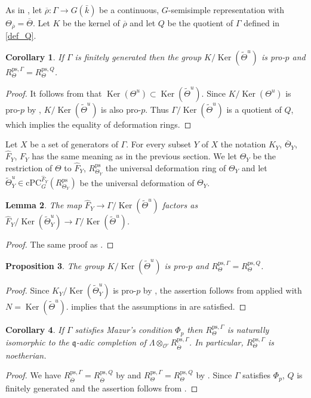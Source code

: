\documentclass{amsart}
\newtheorem{prop}{Proposition}[section]
\newtheorem{lem}[prop]{Lemma}
\newtheorem{cor}[prop]{Corollary}
\theoremstyle{definition}
\theoremstyle{remark}
\DeclareMathOperator{\Ker}{Ker}
\newcommand{\OO}{\mathcal O}
\newcommand{\qq}{\mathfrak{q}}
\newcommand{\rhobar}{\overline{\rho}}
\newcommand{\kbar}{\bar{k}}
\newcommand{\cPC}{\mathrm{cPC}}
\newcommand{\Thetabar}{\overline{\Theta}}
\newcommand{\ps}{\mathrm{ps}}
\newcommand{\Fhat}{\widehat{F}}
\newcommand{\wTheta}{\widetilde{\Theta}}
\begin{document}
As in , let $\rhobar: \Gamma \rightarrow G(\kbar)$ be a 
continuous, $G$-semisimple representation with $\Theta_{\rhobar}=\Thetabar$.
Let $K$ be the kernel of $\rhobar$ and let $Q$ be the quotient of $\Gamma$ 
defined in \eqref{def_Q}.


\begin{cor}\label{pro-p-again} If $\Gamma$ is finitely generated then the group $K/\Ker(\wTheta^u)$ is 
pro-$p$ and $R^{\ps, \Gamma}_{\Theta}=R^{\ps, Q}_{\Theta}$.
\end{cor}
\begin{proof} It follows from  that $\Ker(\Theta^u)\subset \Ker(\wTheta^u)$. Since $K/\Ker(\Theta^u)$ is pro-$p$ by , 
$K/\Ker(\wTheta^u)$ is also pro-$p$. Thus $\Gamma/\Ker(\wTheta^u)$ 
is a quotient of $Q$, which implies the equality of deformation rings.
\end{proof}

Let $X$ be a set of generators of $\Gamma$. For every subset $Y$ of $X$ the notation 
$K_Y$, $\Thetabar_Y$, $\widehat{F}_Y$, $F_Y$ has the same meaning as in the previous 
section. We let $\Theta_Y$ be the restriction of $\Theta$ to $\widehat{F}_Y$, 
$R^{\ps}_{\Theta_Y}$ the universal deformation ring of $\Theta_Y$ and let $\wTheta^u_Y\in \cPC^{\widehat{F}_Y}_G(R^{\ps}_{\Theta_Y})$ be
the universal deformation of $\Theta_Y$.

\begin{lem}\label{thru} The 
map $\Fhat_Y \rightarrow \Gamma/\Ker(\wTheta^u)$ factors as
$\Fhat_Y/\Ker(\wTheta^u_Y)\rightarrow \Gamma /\Ker(\wTheta^u)$. 
\end{lem}
\begin{proof} The same proof as .
\end{proof}

\begin{prop}\label{main_kappa} The group $K/\Ker(\wTheta^u)$ is pro-$p$ and 
$R^{\ps, \Gamma}_{\Theta}=R^{\ps, Q}_{\Theta}$.
\end{prop}
\begin{proof} Since $K_Y/\Ker(\wTheta^u_Y)$ is pro-$p$ by 
,
the assertion follows from  applied 
with $N=\Ker(\wTheta^u)$.  implies that the 
assumptions in  are satisfied.
\end{proof}

\begin{cor} If $\Gamma$ satisfies Mazur's 
condition $\Phi_p$ then $R^{\ps, \Gamma}_{\Theta}$ 
is naturally isomorphic to the $\qq$-adic completion
of $\Lambda\otimes_{\OO'} R^{\ps, \Gamma}_{\Thetabar}$. In particular, $R^{\ps, \Gamma}_{\Theta}$ is noetherian.
\end{cor}
\begin{proof} We have $R^{\ps, \Gamma}_{\Thetabar}= R^{\ps, Q}_{\Thetabar}$
by  and $R^{\ps, \Gamma}_{\Theta}=R^{\ps, Q}_{\Theta}$
by . Since $\Gamma$ satisfies $\Phi_p$, $Q$ is finitely generated 
and the assertion follows from .
\end{proof}
\end{document}
